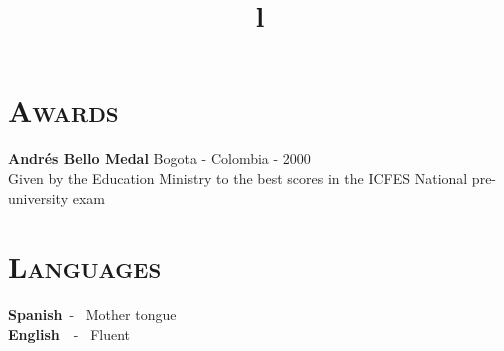\begin{resume}

\section{\textsc{Awards}}
\textbf{Andr\'{e}s Bello Medal} \hfill          Bogota - Colombia - 2000 \\
Given by the Education Ministry to the best scores in the ICFES National pre-university exam \hfill 

\section{\textsc{Languages}}
\textbf{Spanish}\   - \  Mother tongue \\
\textbf{English}\ \  - \ Fluent 
\begin{formatb}
  \title{l}\\
 \\
  \body\\
\end{formatb}


\end{resume}
